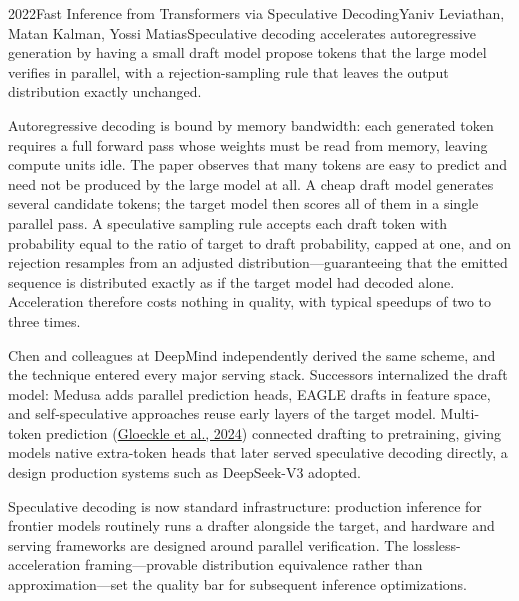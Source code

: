 
\begin{papersummary}{2022}{Fast Inference from Transformers via Speculative Decoding}{Yaniv Leviathan, Matan Kalman, Yossi Matias}{Speculative decoding accelerates autoregressive generation by having a small draft model propose tokens that the large model verifies in parallel, with a rejection-sampling rule that leaves the output distribution exactly unchanged.}

Autoregressive decoding is bound by memory bandwidth: each generated token requires a full forward pass whose weights must be read from memory, leaving compute units idle. The paper observes that many tokens are easy to predict and need not be produced by the large model at all. A cheap draft model generates several candidate tokens; the target model then scores all of them in a single parallel pass. A speculative sampling rule accepts each draft token with probability equal to the ratio of target to draft probability, capped at one, and on rejection resamples from an adjusted distribution---guaranteeing that the emitted sequence is distributed exactly as if the target model had decoded alone. Acceleration therefore costs nothing in quality, with typical speedups of two to three times.

Chen and colleagues at DeepMind independently derived the same scheme, and the technique entered every major serving stack. Successors internalized the draft model: Medusa adds parallel prediction heads, EAGLE drafts in feature space, and self-speculative approaches reuse early layers of the target model. Multi-token prediction (\hyperref[paper:gloeckle-2024-mtp]{Gloeckle et al., 2024}) connected drafting to pretraining, giving models native extra-token heads that later served speculative decoding directly, a design production systems such as DeepSeek-V3 adopted.

Speculative decoding is now standard infrastructure: production inference for frontier models routinely runs a drafter alongside the target, and hardware and serving frameworks are designed around parallel verification. The lossless-acceleration framing---provable distribution equivalence rather than approximation---set the quality bar for subsequent inference optimizations.

\end{papersummary}
